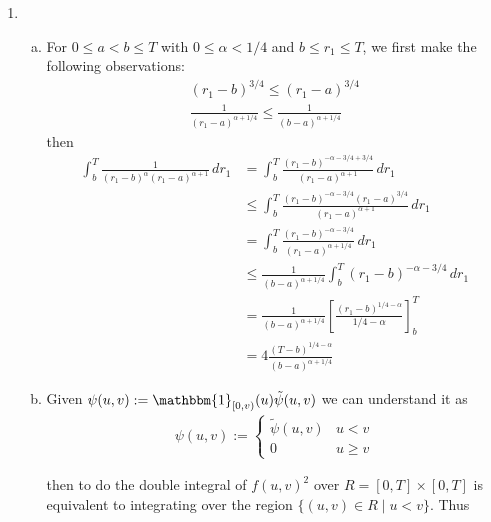 \documentclass[a4paper,12pt]{article}
\theoremstyle{definition}
\begin{document}
\begin{enumerate}
\item
\begin{enumerate}[(a)]
\item For $0 \leq a < b \leq T$ with $0 \leq \alpha < 1/4$ and $b \leq r_1 \leq T$, we first make the following observations:
\begin{align}
(r_1-b)^{3/4} \leq (r_1-a)^{3/4}\\
\frac{1}{(r_1-a)^{\alpha+1/4}} \leq \frac{1}{(b-a)^{\alpha+1/4}}
\end{align}
then
\begin{align*}
\int_{b}^{T}\frac{1}{(r_1-b)^\alpha(r_1-a)^{\alpha+1}}\,dr_1 &= \int_{b}^{T}\frac{(r_1-b)^{-\alpha-3/4+3/4}}{(r_1-a)^{\alpha+1}}\,dr_1\\
&\leq \int_{b}^{T}\frac{(r_1-b)^{-\alpha-3/4}(r_1-a)^{3/4}}{(r_1-a)^{\alpha+1}}\,dr_1\\
&= \int_{b}^{T}\frac{(r_1-b)^{-\alpha-3/4}}{(r_1-a)^{\alpha+1/4}}\,dr_1\\
&\leq \frac{1}{(b-a)^{\alpha+1/4}}\int_{b}^{T}(r_1-b)^{-\alpha-3/4}\,dr_1\\
&= \frac{1}{(b-a)^{\alpha+1/4}}\left[\frac{(r_1-b)^{1/4-\alpha}}{1/4-\alpha}\right]_{b}^{T}\\
&= 4\frac{(T-b)^{1/4-\alpha}}{(b-a)^{\alpha+1/4}}
\end{align*}


\item 
Given $\psi(u,v):= \mathbbm{1}_{[0,v)}(u)\tilde{\psi}(u,v)$ we can understand it as
\begin{align*}
\psi(u,v):=\begin{cases}
\tilde{\psi}(u,v) & u <v\\
0 & u \geq v
\end{cases}
\end{align*}

then to do the double integral of $f(u,v)^2$ over $R = [0,T] \times [0,T]$ is equivalent to integrating over the region $\{(u,v) \in R\mid u < v\}$. Thus 


\end{enumerate}
\end{enumerate}
\end{document}
